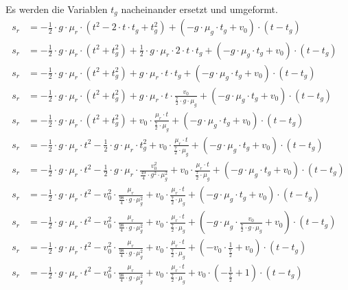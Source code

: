 Es werden die Variablen $t_g$ nacheinander ersetzt und umgeformt.
\begin{align}
    s_r &= - \frac{1}{2} \cdot g \cdot \mu_r \cdot (t^2 - 2 \cdot t \cdot t_g + t_g^2) + (-g \cdot \mu_g \cdot t_g + v_0) \cdot (t - t_g)\\
    s_r &= - \frac{1}{2} \cdot g \cdot \mu_r \cdot (t^2 + t_g^2) + \frac{1}{2} \cdot g \cdot \mu_r \cdot 2 \cdot t \cdot t_g + (-g \cdot \mu_g \cdot t_g + v_0) \cdot (t - t_g)\\
    s_r &= - \frac{1}{2} \cdot g \cdot \mu_r \cdot (t^2 + t_g^2) + g \cdot \mu_r \cdot t \cdot t_g + (-g \cdot \mu_g \cdot t_g + v_0) \cdot (t - t_g)\\
    s_r &= - \frac{1}{2} \cdot g \cdot \mu_r \cdot (t^2 + t_g^2) + g \cdot \mu_r \cdot t \cdot \frac{v_0}{\frac{7}{2} \cdot g \cdot \mu_g} + (-g \cdot \mu_g \cdot t_g + v_0) \cdot (t - t_g)\\
    s_r &= - \frac{1}{2} \cdot g \cdot \mu_r \cdot (t^2 + t_g^2) + v_0 \cdot \frac{\mu_r \cdot t}{\frac{7}{2} \cdot \mu_g} + (-g \cdot \mu_g \cdot t_g + v_0) \cdot (t - t_g)\\
    s_r &= - \frac{1}{2} \cdot g \cdot \mu_r \cdot t^2 - \frac{1}{2} \cdot g \cdot \mu_r \cdot t_g^2 + v_0 \cdot \frac{\mu_r \cdot t}{\frac{7}{2} \cdot \mu_g} + (-g \cdot \mu_g \cdot t_g + v_0) \cdot (t - t_g)\\
    s_r &= - \frac{1}{2} \cdot g \cdot \mu_r \cdot t^2 - \frac{1}{2} \cdot g \cdot \mu_r \cdot \frac{v_0^2}{\frac{49}{4} \cdot g^2 \cdot \mu_g^2} + v_0 \cdot \frac{\mu_r \cdot t}{\frac{7}{2} \cdot \mu_g} + (-g \cdot \mu_g \cdot t_g + v_0) \cdot (t - t_g)\\
    s_r &= - \frac{1}{2} \cdot g \cdot \mu_r \cdot t^2 - v_0^2 \cdot \frac{\mu_r}{\frac{98}{4} \cdot g \cdot \mu_g^2} + v_0 \cdot \frac{\mu_r \cdot t}{\frac{7}{2} \cdot \mu_g} + (-g \cdot \mu_g \cdot t_g + v_0) \cdot (t - t_g)\\
    s_r &= - \frac{1}{2} \cdot g \cdot \mu_r \cdot t^2 - v_0^2 \cdot \frac{\mu_r}{\frac{98}{4} \cdot g \cdot \mu_g^2} + v_0 \cdot \frac{\mu_r \cdot t}{\frac{7}{2} \cdot \mu_g} + (-g \cdot \mu_g \cdot \frac{v_0}{\frac{7}{2} \cdot g \cdot \mu_g} + v_0) \cdot (t - t_g)\\
    s_r &= - \frac{1}{2} \cdot g \cdot \mu_r \cdot t^2 - v_0^2 \cdot \frac{\mu_r}{\frac{98}{4} \cdot g \cdot \mu_g^2} + v_0 \cdot \frac{\mu_r \cdot t}{\frac{7}{2} \cdot \mu_g} + (-v_0 \cdot \frac{1}{\frac{7}{2}} + v_0) \cdot (t - t_g)\\
    s_r &= - \frac{1}{2} \cdot g \cdot \mu_r \cdot t^2 - v_0^2 \cdot \frac{\mu_r}{\frac{98}{4} \cdot g \cdot \mu_g^2} + v_0 \cdot \frac{\mu_r \cdot t}{\frac{7}{2} \cdot \mu_g} + v_0 \cdot (-\frac{1}{\frac{7}{2}} + 1) \cdot (t - t_g)\\

\end{align}

